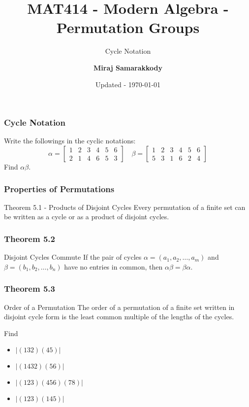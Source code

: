 \documentclass{beamer}
\title{MAT414 - Modern Algebra - Permutation Groups}
\subtitle{Cycle Notation}
\author{\textbf{Miraj Samarakkody}}
\institute{Tougaloo College}
\date{Updated - \today}
\begin{document}
\begin{frame}
    \titlepage
\end{frame}




\begin{frame}
    \frametitle{Cycle Notation}

    Write the followings in the cyclic notations:
    \[
    \alpha = \begin{bmatrix}
        1 & 2 & 3& 4 & 5 & 6\\
        2& 1& 4 & 6 & 5 & 3
    \end{bmatrix}\quad \beta =  \begin{bmatrix}
        1 & 2 & 3& 4 & 5 & 6\\
        5& 3& 1 & 6 & 2 & 4
    \end{bmatrix}
    \] \pause
    Find \(\alpha \beta\). 

\end{frame}

\begin{frame}
    \frametitle{Properties of Permutations}

    \begin{block}{Theorem 5.1 - Products of Disjoint Cycles}
        Every permutation of a finite set can be written as a cycle or as a product of disjoint cycles. 
    \end{block}

\end{frame}

\begin{frame}
    \frametitle{Theorem 5.2}

    \begin{block}{Disjoint Cycles Commute}
        If the pair of cycles \(\alpha = (a_1,a_2, \dots, a_m)\) and \(\beta =(b_1, b_2, \dots, b_n)\) have no entries in common, then \(\alpha \beta = \beta \alpha\).
    \end{block}

\end{frame}

\begin{frame}
    \frametitle{Theorem 5.3}

    \begin{block}{Order of a Permutation}
        The order of a permutation of a finite set written in disjoint cycle form is the least common multiple of the lengths of the cycles. 
    \end{block}\pause

\vspace{0.2in}
    Find \begin{itemize}
        \item \(|(132)(45)|\)
        \item \(|(1432)(56)|\)
        \item \(|(123)(456)(78)|\)
        \item \(|(123)(145)|\)
    \end{itemize}

\end{frame}
\end{document}
